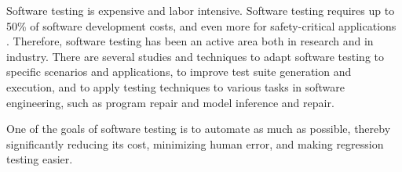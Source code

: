 Software testing is expensive and labor intensive. Software testing requires up to 50\% of software development costs, and even more for safety-critical applications \cite{testingbook}.
Therefore, software testing has been an active area both in research and in industry.
There are several studies and techniques to adapt software testing to specific scenarios and applications, to improve test suite generation and execution, and to apply testing techniques to various tasks in software engineering, such as program repair and model inference and repair. \cite{le_goues_systematic_2012,chiang_unified_2011,Duchene:2012,Xuan_2017}

One of the goals of software testing is to automate as much as possible, thereby significantly reducing its cost, minimizing human error, and making regression testing easier. \cite{testingbook}


